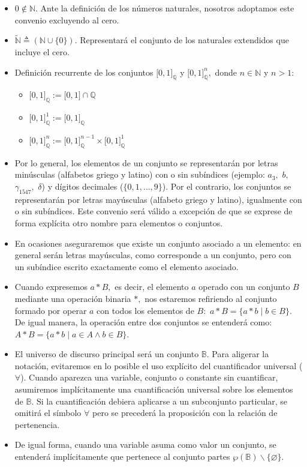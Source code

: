 \begin{itemize}
    \item $0 \notin \mathbb{N}.$ Ante la definición de los números naturales, nosotros adoptamos este convenio excluyendo al cero.
    \item $\widetilde{\mathbb{N}} \triangleq \left( \mathbb{N} \cup \{0\} \right).$ Representará el conjunto de los naturales extendidos que incluye el cero.
    \item Definición recurrente de los conjuntos $\lbrack 0,1 \rbrack_{\mathbb{Q}}$ y $\lbrack 0,1 \rbrack_{\mathbb{Q}}^n,$ donde $n \in \mathbb{N}$ y $n > 1:$
    \begin{itemize}
        \item $\lbrack 0,1 \rbrack_{\mathbb{Q}} := \lbrack 0,1 \rbrack \cap \mathbb{Q}$
        \item $\lbrack 0,1 \rbrack_{\mathbb{Q}}^1 := \lbrack 0,1 \rbrack_{\mathbb{Q}}$
        \item $\lbrack 0,1 \rbrack_{\mathbb{Q}}^n := \lbrack 0,1 \rbrack_{\mathbb{Q}}^{n-1} \times \lbrack 0,1 \rbrack_{\mathbb{Q}}^1$
    \end{itemize}
    \item Por lo general, los elementos de un conjunto se representarán por letras minúsculas (alfabetos griego y latino) con o sin subíndices (ejemplo: $a_3,$ $b,$ $\gamma_{1547},$ $\delta$) y dígitos decimales ($\{0, 1, \ldots, 9\}$). Por el contrario, los conjuntos se representarán por letras mayúsculas (alfabeto griego y latino), igualmente con o sin subíndices. Este convenio será válido a excepción de que se exprese de forma explícita otro nombre para elementos o conjuntos.
    \item En ocasiones aseguraremos que existe un conjunto asociado a un elemento: en general serán letras mayúsculas, como corresponde a un conjunto, pero con un subíndice escrito exactamente como el elemento asociado. 
    \item Cuando expresemos $a \ast B,$ es decir, el elemento $a$ operado con un conjunto $B$ mediante una operación binaria $\ast,$ nos estaremos refiriendo al conjunto formado por operar $a$ con todos los elementos de $B:$ $a \ast B = \{ a \ast b \mid b \in B \}.$ De igual manera, la operación entre dos conjuntos se entenderá como: $A \ast B = \{ a \ast b \mid a \in A \land b \in B \}.$
    \item El universo de discurso principal será un conjunto $\mathbb{B}.$ Para aligerar la notación, evitaremos en lo posible el uso explícito del cuantificador universal ($\forall$). Cuando aparezca una variable, conjunto o constante sin cuantificar, asumiremos implícitamente una cuantificación universal sobre los elementos de $\mathbb{B}.$ Si la cuantificación debiera aplicarse a un subconjunto particular, se omitirá el símbolo $\forall$ pero se precederá la proposición con la relación de pertenencia. 
    \item De igual forma, cuando una variable asuma como valor un conjunto, se entenderá implícitamente que pertenece al conjunto partes $\wp(\mathbb{B}) \smallsetminus \{ \varnothing \}.$ 
\end{itemize}

